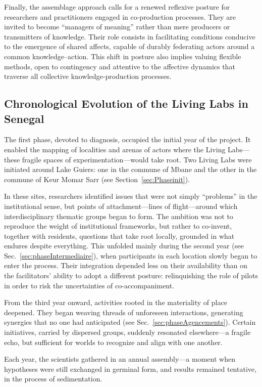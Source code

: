 \documentclass{article}
\begin{document}
Finally, the assemblage approach calls for a renewed reflexive posture for researchers and practitioners engaged in co-production processes. They are invited to become “managers of meaning” rather than mere producers or transmitters of knowledge. Their role consists in facilitating conditions conducive to the emergence of shared affects, capable of durably federating actors around a common knowledge–action. This shift in posture also implies valuing flexible methods, open to contingency and attentive to the affective dynamics that traverse all collective knowledge-production processes.  

\subsection{Chronological Evolution of the Living Labs in Senegal}

The first phase, devoted to diagnosis, occupied the initial year of the project. It enabled the mapping of localities and arenas of actors where the Living Labs—these fragile spaces of experimentation—would take root. Two Living Labs were initiated around Lake Guiers: one in the commune of Mbane and the other in the commune of Keur Momar Sarr (see Section~\ref{sec:Phaseinit}).  

In these sites, researchers identified issues that were not simply “problems” in the institutional sense, but points of attachment—lines of flight—around which interdisciplinary thematic groups began to form. The ambition was not to reproduce the weight of institutional frameworks, but rather to co-invent, together with residents, questions that take root locally, grounded in what endures despite everything. This unfolded mainly during the second year (see Sec.~\ref{sec:phaseIntermediaire}), when participants in each location slowly began to enter the process. Their integration depended less on their availability than on the facilitators’ ability to adopt a different posture: relinquishing the role of pilots in order to risk the uncertainties of co-accompaniment.  

From the third year onward, activities rooted in the materiality of place deepened. They began weaving threads of unforeseen interactions, generating synergies that no one had anticipated (see Sec.~\ref{sec:phaseAgencements}). Certain initiatives, carried by dispersed groups, suddenly resonated elsewhere—a fragile echo, but sufficient for worlds to recognize and align with one another.  

Each year, the scientists gathered in an annual assembly—a moment when hypotheses were still exchanged in germinal form, and results remained tentative, in the process of sedimentation.  
\end{document}
